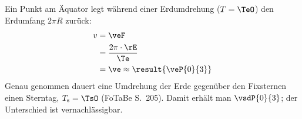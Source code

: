 Ein Punkt am Äquator legt während einer Erdumdrehung ($T = \TeO$) den Erdumfang $2\pi R$ zurück:
\begin{align}
 v &= \veF \\
   &= \frac{2\pi\cdot\rE}{\Te} \\
   &= \ve \approx \result{\veP{0}{3}}
\end{align}
Genau genommen dauert eine Umdrehung der Erde gegenüber den Fixsternen einen Sterntag, $T_\text{s} = \TsO$ (FoTaBe S.~205). Damit erhält man $\vsdP{0}{3}$; der Unterschied ist vernachlässigbar.
